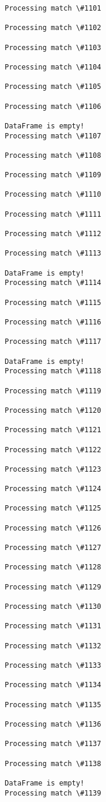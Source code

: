 \documentclass[11pt]{article}
\begin{document}
\begin{Verbatim}[commandchars=\\\{\}]
Processing match \#1101

Processing match \#1102

Processing match \#1103

Processing match \#1104

Processing match \#1105

Processing match \#1106

DataFrame is empty!
Processing match \#1107

Processing match \#1108

Processing match \#1109

Processing match \#1110

Processing match \#1111

Processing match \#1112

Processing match \#1113

DataFrame is empty!
Processing match \#1114

Processing match \#1115

Processing match \#1116

Processing match \#1117

DataFrame is empty!
Processing match \#1118

Processing match \#1119

Processing match \#1120

Processing match \#1121

Processing match \#1122

Processing match \#1123

Processing match \#1124

Processing match \#1125

Processing match \#1126

Processing match \#1127

Processing match \#1128

Processing match \#1129

Processing match \#1130

Processing match \#1131

Processing match \#1132

Processing match \#1133

Processing match \#1134

Processing match \#1135

Processing match \#1136

Processing match \#1137

Processing match \#1138

DataFrame is empty!
Processing match \#1139


\end{Verbatim}
\end{document}
